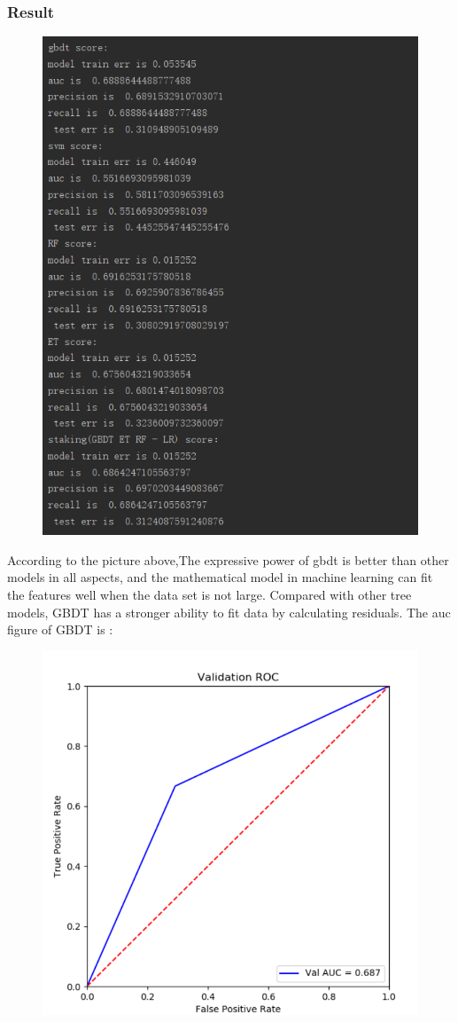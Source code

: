 \documentclass{article}
\begin{document}
 \subsubsection{Result}
    \begin{figure}[H]
\centering
  \includegraphics[width=.8\textwidth]{3-10.png} %
  \end{figure}
According to the picture above,The expressive power of gbdt is better than other models in all aspects, and the mathematical model in machine learning can fit the features well when the data set is not large. Compared with other tree models, GBDT has a stronger ability to fit data by calculating residuals.
The auc figure of GBDT is :
    \begin{figure}[H]
\centering
  \includegraphics[width=.8\textwidth]{3-11.png} %
  \end{figure}
\end{document}
